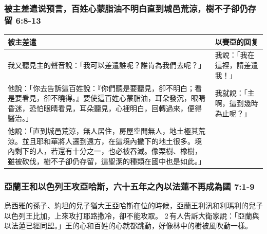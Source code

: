 \subsubsection{被主差遣说预言，百姓心蒙脂油不明白直到城邑荒涼，樹不子卻仍存留 6:8-13}
\begin{table}[H]
\centering 
\begin{tabular}{p{12.5cm}|p{4.5cm}}\hline\hline
被主差遣&以賽亞的回复\\\hline
我又聽見主的聲音說：「我可以差遣誰呢？誰肯為我們去呢？」
&我說：「我在這裡，請差遣我！」 \\\hline
他說：「你去告訴這百姓說：『你們聽是要聽見，卻不明白；看是要看見，卻不曉得。』要使這百姓心蒙脂油，耳朵發沉，眼睛昏迷，恐怕眼睛看見，耳朵聽見，心裡明白，回轉過來，便得醫治。」&我就說：「主啊，這到幾時為止呢？」 \\\hline
他說：「直到城邑荒涼，無人居住，房屋空閒無人，地土極其荒涼。並且耶和華將人遷到遠方，在這境內撇下的地土很多。境內剩下的人，若還有十分之一，也必被吞滅。像栗樹、橡樹，雖被砍伐，樹不子卻仍存留，這聖潔的種類在國中也是如此。」& \\\hline
\end{tabular}
\end{table}





\subsubsection{亞蘭王和以色列王攻亞哈斯，六十五年之內以法蓮不再成為國 7:1-9}
烏西雅的孫子、約坦的兒子猶大王亞哈斯在位的時候，亞蘭王利汛和利瑪利的兒子以色列王比加，上來攻打耶路撒冷，卻不能攻取。 2 有人告訴大衛家說：「亞蘭與以法蓮已經同盟。」王的心和百姓的心就都跳動，好像林中的樹被風吹動一樣。

